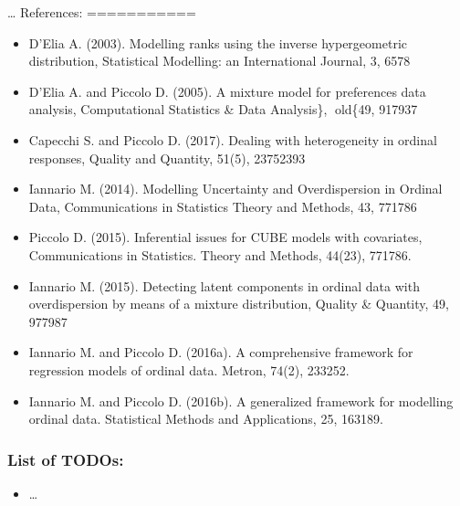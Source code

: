 \documentclass[letterpaper,10pt,english]{sphinxmanual}
\begin{document}
\sphinxAtStartPar
…
References:
===========
\begin{itemize}
\item {} 
\sphinxAtStartPar
D’Elia A. (2003). Modelling ranks using the inverse hypergeometric distribution, Statistical Modelling: an International Journal, 3, 65\textendash{}78

\item {} 
\sphinxAtStartPar
D’Elia A. and Piccolo D. (2005). A mixture model for preferences data analysis, Computational Statistics \& Data Analysis\},  old\{49, 917\textendash{}937

\item {} 
\sphinxAtStartPar
Capecchi S. and Piccolo D. (2017). Dealing with heterogeneity in ordinal responses, Quality and Quantity, 51(5), 2375\textendash{}2393

\item {} 
\sphinxAtStartPar
Iannario M. (2014). Modelling Uncertainty and Overdispersion in Ordinal Data, Communications in Statistics \sphinxhyphen{} Theory and Methods, 43, 771\textendash{}786

\item {} 
\sphinxAtStartPar
Piccolo D. (2015). Inferential issues for CUBE models with covariates, Communications in Statistics. Theory and Methods, 44(23), 771\textendash{}786.

\item {} 
\sphinxAtStartPar
Iannario M. (2015). Detecting latent components in ordinal data with overdispersion by means of a mixture distribution, Quality \& Quantity, 49, 977\textendash{}987

\item {} 
\sphinxAtStartPar
Iannario M. and Piccolo D. (2016a). A comprehensive framework for regression models of ordinal data. Metron, 74(2), 233\textendash{}252.

\item {} 
\sphinxAtStartPar
Iannario M. and Piccolo D. (2016b). A generalized framework for modelling ordinal data. Statistical Methods and Applications, 25, 163\textendash{}189.

\end{itemize}


\subsubsection{List of TODOs:}
\label{\detokenize{cubmods:id253}}\begin{itemize}
\item {} 
\sphinxAtStartPar
…

\end{itemize}
\end{document}

